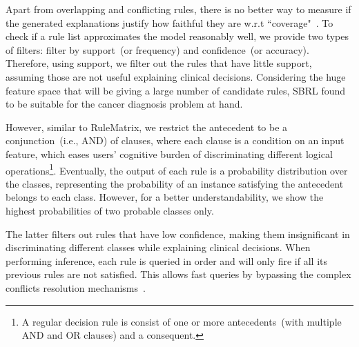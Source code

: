 \hspace*{3.5mm} Apart from overlapping and conflicting rules, there is no better way to measure if the generated explanations justify how faithful they are w.r.t ``coverage"~\cite{ming2018rulematrix}. To check if a rule list approximates the model reasonably well, we provide two types of filters: filter by support~(or frequency) and confidence~(or accuracy). Therefore, using support, we filter out the rules that have little support, assuming those are not useful explaining clinical decisions. Considering the huge feature space that will be giving a large number of candidate rules, SBRL found to be suitable for the cancer diagnosis problem at hand. 

\hspace*{3.5mm} However, similar to RuleMatrix, we restrict the antecedent to be a conjunction~(i.e., AND) of clauses, where each clause is a condition on an input feature, which eases users' cognitive burden of discriminating different logical operations\footnote{A regular  decision rule is consist of one or more antecedents~(with multiple AND and OR clauses) and a consequent.}. Eventually, the output of each rule is a probability distribution over the classes, representing the probability of an instance satisfying the antecedent belongs to each class. However, for a better understandability, we show the highest probabilities of two probable classes only. 

\hspace*{3.5mm} The latter filters out rules that have low confidence, making them insignificant in discriminating different classes while explaining clinical decisions. When performing inference, each rule is queried in order and will only fire if all its previous rules are not satisfied. This allows fast queries by bypassing the complex conflicts resolution mechanisms~\cite{ribeiro2018anchors}. 



